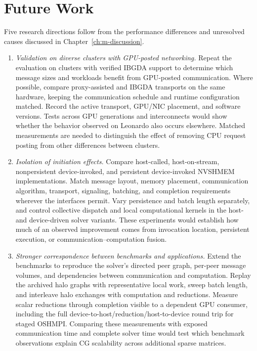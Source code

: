 \section{Future Work}\label{sec:priority-experiments}

Five research directions follow from the performance differences and unresolved causes discussed in Chapter~\ref{ch:m-discussion}.

\begin{enumerate}
    \item \emph{Validation on diverse clusters with GPU-posted networking.}
    Repeat the evaluation on clusters with verified IBGDA support to determine which message sizes and workloads benefit from GPU-posted communication. Where possible, compare proxy-assisted and IBGDA transports on the same hardware, keeping the communication schedule and runtime configuration matched. Record the active transport, GPU/NIC placement, and software versions. Tests across GPU generations and interconnects would show whether the behavior observed on Leonardo also occurs elsewhere. Matched measurements are needed to distinguish the effect of removing CPU request posting from other differences between clusters.

    \item \emph{Isolation of initiation effects.}
    Compare host-called, host-on-stream, nonpersistent device-invoked, and persistent device-invoked NVSHMEM implementations. Match message layout, memory placement, communication algorithm, transport, signaling, batching, and completion requirements wherever the interfaces permit. Vary persistence and batch length separately, and control collective dispatch and local computational kernels in the host- and device-driven solver variants. These experiments would establish how much of an observed improvement comes from invocation location, persistent execution, or communication--computation fusion.

    \item \emph{Stronger correspondence between benchmarks and applications.}
    Extend the benchmarks to reproduce the solver's directed peer graph, per-peer message volumes, and dependencies between communication and computation. Replay the archived halo graphs with representative local work, sweep batch length, and interleave halo exchanges with computation and reductions. Measure scalar reductions through completion visible to a dependent GPU consumer, including the full device-to-host/reduction/host-to-device round trip for staged OSHMPI. Comparing these measurements with exposed communication time and complete solver time would test which benchmark observations explain CG scalability across additional sparse matrices.


\end{enumerate}
